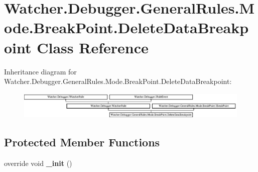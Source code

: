 \hypertarget{class_watcher_1_1_debugger_1_1_general_rules_1_1_mode_1_1_break_point_1_1_delete_data_breakpoint}{\section{Watcher.\+Debugger.\+General\+Rules.\+Mode.\+Break\+Point.\+Delete\+Data\+Breakpoint Class Reference}
\label{class_watcher_1_1_debugger_1_1_general_rules_1_1_mode_1_1_break_point_1_1_delete_data_breakpoint}
}
Inheritance diagram for Watcher.\+Debugger.\+General\+Rules.\+Mode.\+Break\+Point.\+Delete\+Data\+Breakpoint\+:\begin{figure}[H]
\begin{center}
\leavevmode
\includegraphics[height=1.290323cm]{class_watcher_1_1_debugger_1_1_general_rules_1_1_mode_1_1_break_point_1_1_delete_data_breakpoint}
\end{center}
\end{figure}
\subsection*{Protected Member Functions}
\begin{DoxyCompactItemize}
\item 
\hypertarget{class_watcher_1_1_debugger_1_1_general_rules_1_1_mode_1_1_break_point_1_1_delete_data_breakpoint_a1e6b6c9a4c450eccfdedd0806e48aa6e}{override void {\bfseries \+\_\+init} ()}\label{class_watcher_1_1_debugger_1_1_general_rules_1_1_mode_1_1_break_point_1_1_delete_data_breakpoint_a1e6b6c9a4c450eccfdedd0806e48aa6e}

\end{DoxyCompactItemize}
